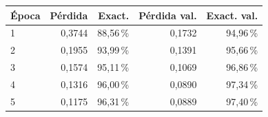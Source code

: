\begin{tabular}{lrrrr}
\toprule
Época & Pérdida & Exact. & Pérdida val. & Exact. val. \\
\midrule
1 & 0,3744 & 88,56\,\% & 0,1732 & 94,96\,\% \\
2 & 0,1955 & 93,99\,\% & 0,1391 & 95,66\,\% \\
3 & 0,1574 & 95,11\,\% & 0,1069 & 96,86\,\% \\
4 & 0,1316 & 96,00\,\% & 0,0890 & 97,34\,\% \\
5 & 0,1175 & 96,31\,\% & 0,0889 & 97,40\,\% \\
\bottomrule
\end{tabular}
